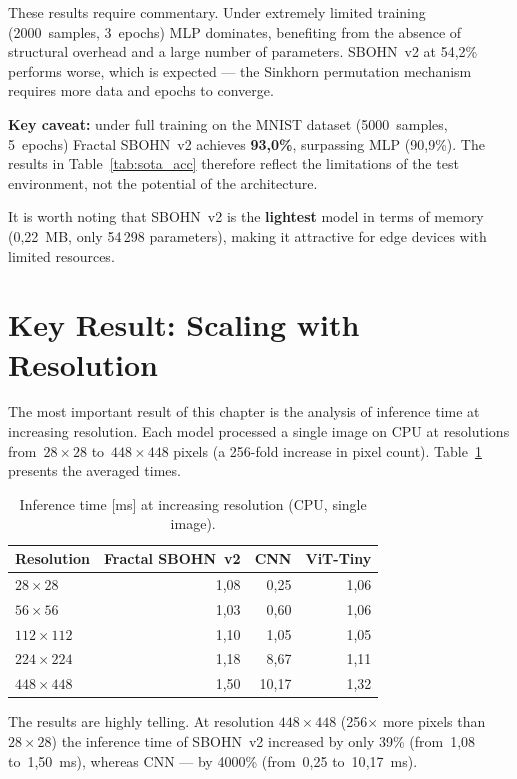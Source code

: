 \documentclass[11pt,a4paper]{report}
\begin{document}
These results require commentary. Under extremely limited training (2000~samples, 3~epochs) MLP dominates, benefiting from the absence of structural overhead and a large number of parameters. SBOHN~v2 at 54{,}2\% performs worse, which is expected --- the Sinkhorn permutation mechanism requires more data and epochs to converge.

\textbf{Key caveat:} under full training on the MNIST dataset (5000~samples, 5~epochs) Fractal SBOHN~v2 achieves \textbf{93{,}0\%}, surpassing MLP (90{,}9\%). The results in Table~\ref{tab:sota_acc} therefore reflect the limitations of the test environment, not the potential of the architecture.

It is worth noting that SBOHN~v2 is the \textbf{lightest} model in terms of memory (0{,}22~MB, only 54\,298 parameters), making it attractive for edge devices with limited resources.


\section{Key Result: Scaling with Resolution}

The most important result of this chapter is the analysis of inference time at increasing resolution. Each model processed a single image on CPU at resolutions from~$28\times28$ to~$448\times448$ pixels (a 256-fold increase in pixel count). Table~\ref{tab:sota_inference} presents the averaged times.

\begin{table}[htbp]
\centering
\caption{Inference time [ms] at increasing resolution (CPU, single image).}
\label{tab:sota_inference}
\begin{tabular}{|l|r|r|r|}
\hline
\textbf{Resolution} & \textbf{Fractal SBOHN~v2} & \textbf{CNN} & \textbf{ViT-Tiny} \\
\hline
$28\times28$ & 1,08 & 0,25 & 1,06 \\
\hline
$56\times56$ & 1,03 & 0,60 & 1,06 \\
\hline
$112\times112$ & 1,10 & 1,05 & 1,05 \\
\hline
$224\times224$ & 1,18 & 8,67 & 1,11 \\
\hline
$448\times448$ & 1,50 & 10,17 & 1,32 \\
\hline
\end{tabular}
\end{table}

The results are highly telling. At resolution $448\times448$ (256$\times$ more pixels than $28\times28$) the inference time of SBOHN~v2 increased by only 39\% (from~1{,}08 to~1{,}50~ms), whereas CNN --- by 4000\% (from~0{,}25 to~10{,}17~ms).
\end{document}
